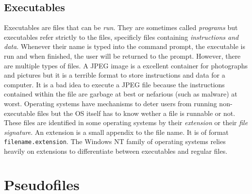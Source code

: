 \subsection{Executables}

Executables are files that can be \textit{run}. They are sometimes called \textit{programs} but executables refer
strictly to the files, specificly files containing \textit{instructions and data}. Whenever their name is
typed into the command prompt, the executable is run and when finished, the user will be returned to
the prompt. However, there are multiple types of files. A JPEG image is a excellent container for
photographs and pictures but it is a terrible format to store instructions and data for a computer.
It is a bad idea to execute a JPEG file because the instructions contained within the file are garbage
at best or nefarious (such as malware) at worst. Operating systems have mechanisms to deter users from
running non-executable files but the OS itself has to know wether a file is runnable or not. These files
are identified in some operating systems by their \textit{extension} or their \textit{file signature}. An extension is
a small appendix to the file name. It is of format \texttt{filename.extension}. The Windows NT family of operating
systems relies heavily on extensions to differentiate between executables and regular files. 

\section{Pseudofiles}

